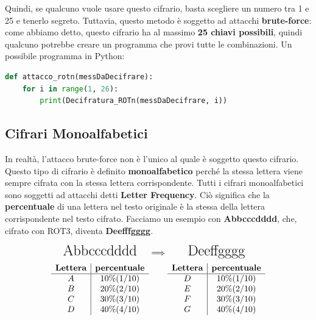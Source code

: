 \documentclass{report}
\begin{document}
Quindi, se qualcuno vuole usare questo cifrario, basta scegliere un numero tra 1 e 25 e tenerlo segreto.  
Tuttavia, questo metodo è soggetto ad attacchi \textbf{brute-force}: come abbiamo detto, questo cifrario ha al massimo \textbf{25 chiavi possibili}, quindi qualcuno potrebbe creare un programma che provi tutte le combinazioni.  
Un possibile programma in Python:


\begin{lstlisting}[language=Python]
def attacco_rotn(messDaDecifrare):
    for i in range(1, 26):
        print(Decifratura_ROTn(messDaDecifrare, i))
\end{lstlisting}


\newpage

\subsection{Cifrari Monoalfabetici}
In realtà, l'attacco brute-force non è l'unico al quale è soggetto questo cifrario.  
Questo tipo di cifrario è definito \textbf{monoalfabetico} perché la stessa lettera viene sempre cifrata con la stessa lettera corrispondente.  
Tutti i cifrari monoalfabetici sono soggetti ad attacchi detti \textbf{Letter Frequency}.  
Ciò significa che la \textbf{percentuale} di una lettera nel testo originale è la stessa della lettera corrispondente nel testo cifrato.  
Facciamo un esempio con \textbf{Abbcccdddd}, che, cifrato con ROT3, diventa \textbf{Deefffgggg}.

\vspace{0.2cm}
\[
\begin{array}{c@{\hskip 0.1cm}c@{\hskip 0.1cm}c}
  \text{\LARGE Abbcccdddd} & \Longrightarrow & \text{\LARGE Deeffgggg} \\[0.2cm]

  \begin{array}{c|c}
    \textbf{Lettera} & \textbf{percentuale} \\
    \hline
    A & 10\% (1/10) \\
    B & 20\% (2/10) \\
    C & 30\% (3/10) \\
    D & 40\% (4/10) \\
  \end{array}
  &
  &
  \begin{array}{c|c}
    \textbf{Lettera} & \textbf{percentuale} \\
    \hline
    D & 10\% (1/10) \\
    E & 20\% (2/10) \\
    F & 30\% (3/10) \\
    G & 40\% (4/10) \\
  \end{array}
\end{array}
\]
\end{document}
